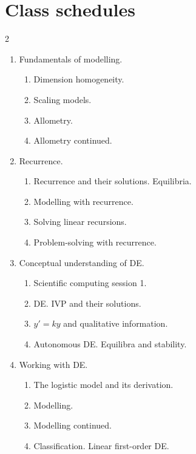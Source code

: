 \documentclass[../main.tex]{subfiles}
\begin{document}
\section{Class schedules}

\begin{multicols}{2}
  \begin{enumerate}[wide, label={\textbf{Week \arabic*}.}]
    \item Fundamentals of modelling.
    \begin{enumerate}
      \item Dimension homogeneity.
      \item Scaling models.
      \item Allometry.
      \item Allometry continued.
    \end{enumerate}

  \item Recurrence.
    \begin{enumerate}[resume]
      \item Recurrence and their solutions.  Equilibria.
      \item Modelling with recurrence.
      \item Solving linear recursions.
      \item Problem-solving with recurrence.
    \end{enumerate}

  \item Conceptual understanding of DE.
    \begin{enumerate}[resume]
      \item Scientific computing session 1.
      \item DE. IVP and their solutions.
      \item \(y' = ky\) and qualitative information.
      \item Autonomous DE. Equilibra and stability.
    \end{enumerate}

  \item Working with DE.
    \begin{enumerate}[resume]
      \item The logistic model and its derivation.
      \item Modelling.
      \item Modelling continued.
      \item Classification. Linear first-order DE.
    \end{enumerate}


\end{enumerate}
\end{multicols}
\end{document}
